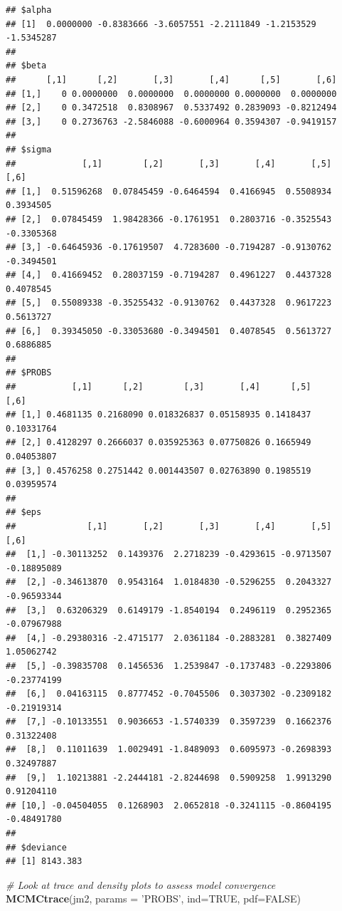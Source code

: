 \documentclass[]{article}
\newenvironment{Shaded}{\begin{snugshade}}{\end{snugshade}}
\newcommand{\CommentTok}[1]{\textcolor[rgb]{0.56,0.35,0.01}{\textit{#1}}}
\newcommand{\DataTypeTok}[1]{\textcolor[rgb]{0.13,0.29,0.53}{#1}}
\newcommand{\KeywordTok}[1]{\textcolor[rgb]{0.13,0.29,0.53}{\textbf{#1}}}
\newcommand{\NormalTok}[1]{#1}
\newcommand{\OtherTok}[1]{\textcolor[rgb]{0.56,0.35,0.01}{#1}}
\newcommand{\StringTok}[1]{\textcolor[rgb]{0.31,0.60,0.02}{#1}}
\begin{document}
\begin{verbatim}
## $alpha
## [1]  0.0000000 -0.8383666 -3.6057551 -2.2111849 -1.2153529 -1.5345287
## 
## $beta
##      [,1]      [,2]       [,3]       [,4]      [,5]       [,6]
## [1,]    0 0.0000000  0.0000000  0.0000000 0.0000000  0.0000000
## [2,]    0 0.3472518  0.8308967  0.5337492 0.2839093 -0.8212494
## [3,]    0 0.2736763 -2.5846088 -0.6000964 0.3594307 -0.9419157
## 
## $sigma
##             [,1]        [,2]       [,3]       [,4]       [,5]       [,6]
## [1,]  0.51596268  0.07845459 -0.6464594  0.4166945  0.5508934  0.3934505
## [2,]  0.07845459  1.98428366 -0.1761951  0.2803716 -0.3525543 -0.3305368
## [3,] -0.64645936 -0.17619507  4.7283600 -0.7194287 -0.9130762 -0.3494501
## [4,]  0.41669452  0.28037159 -0.7194287  0.4961227  0.4437328  0.4078545
## [5,]  0.55089338 -0.35255432 -0.9130762  0.4437328  0.9617223  0.5613727
## [6,]  0.39345050 -0.33053680 -0.3494501  0.4078545  0.5613727  0.6886885
## 
## $PROBS
##           [,1]      [,2]        [,3]       [,4]      [,5]       [,6]
## [1,] 0.4681135 0.2168090 0.018326837 0.05158935 0.1418437 0.10331764
## [2,] 0.4128297 0.2666037 0.035925363 0.07750826 0.1665949 0.04053807
## [3,] 0.4576258 0.2751442 0.001443507 0.02763890 0.1985519 0.03959574
## 
## $eps
##              [,1]       [,2]       [,3]       [,4]       [,5]        [,6]
##  [1,] -0.30113252  0.1439376  2.2718239 -0.4293615 -0.9713507 -0.18895089
##  [2,] -0.34613870  0.9543164  1.0184830 -0.5296255  0.2043327 -0.96593344
##  [3,]  0.63206329  0.6149179 -1.8540194  0.2496119  0.2952365 -0.07967988
##  [4,] -0.29380316 -2.4715177  2.0361184 -0.2883281  0.3827409  1.05062742
##  [5,] -0.39835708  0.1456536  1.2539847 -0.1737483 -0.2293806 -0.23774199
##  [6,]  0.04163115  0.8777452 -0.7045506  0.3037302 -0.2309182 -0.21919314
##  [7,] -0.10133551  0.9036653 -1.5740339  0.3597239  0.1662376  0.31322408
##  [8,]  0.11011639  1.0029491 -1.8489093  0.6095973 -0.2698393  0.32497887
##  [9,]  1.10213881 -2.2444181 -2.8244698  0.5909258  1.9913290  0.91204110
## [10,] -0.04504055  0.1268903  2.0652818 -0.3241115 -0.8604195 -0.48491780
## 
## $deviance
## [1] 8143.383
\end{verbatim}

\begin{Shaded}
\begin{Highlighting}[]
\CommentTok{# Look at trace and density plots to assess model convergence}
\KeywordTok{MCMCtrace}\NormalTok{(jm2, }\DataTypeTok{params =} \StringTok{'PROBS'}\NormalTok{, }\DataTypeTok{ind=}\OtherTok{TRUE}\NormalTok{, }\DataTypeTok{pdf=}\OtherTok{FALSE}\NormalTok{)}
\end{Highlighting}
\end{Shaded}
\end{document}
